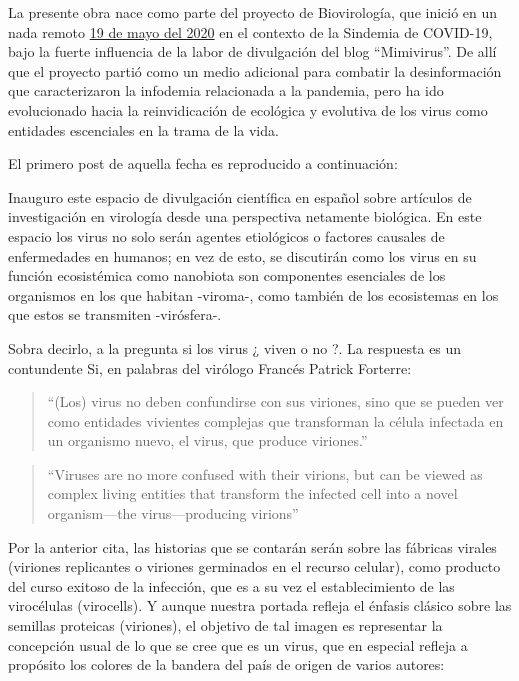 \documentclass[
  12pt, krantz2,
  spanish,
]{krantz}
\begin{document}
La presente obra nace como parte del proyecto de Biovirología, que inició en un nada remoto \href{https://www.facebook.com/permalink.php?story_fbid=107125457678944\&id=107088044349352}{19 de mayo del 2020} en el contexto de la Sindemia de COVID-19, bajo la fuerte influencia de la labor de divulgación del blog ``Mimivirus''. De allí que el proyecto partió como un medio adicional para combatir la desinformación que caracterizaron la infodemia relacionada a la pandemia, pero ha ido evolucionado hacia la reinvidicación de ecológica y evolutiva de los virus como entidades escenciales en la trama de la vida.

El primero post de aquella fecha es reproducido a continuación:

Inauguro este espacio de divulgación científica en español sobre artículos de investigación en virología desde una perspectiva netamente biológica. En este espacio los virus no solo serán agentes etiológicos o factores causales de enfermedades en humanos; en vez de esto, se discutirán como los virus en su función ecosistémica como nanobiota son componentes esenciales de los organismos en los que habitan -viroma-, como también de los ecosistemas en los que estos se transmiten -virósfera-.

Sobra decirlo, a la pregunta si los virus ¿ viven o no ?. La respuesta es un contundente Si, en palabras del virólogo Francés Patrick Forterre:

\begin{quote}
``(Los) virus no deben confundirse con sus viriones, sino que se pueden ver como entidades vivientes complejas que transforman la célula infectada en un organismo nuevo, el virus, que produce viriones.''
\end{quote}

\begin{quote}
``Viruses are no more confused with their virions, but can be viewed as complex living entities that transform the infected cell into a novel organism---the virus---producing virions'' \citet{forterre2010defining}
\end{quote}

Por la anterior cita, las historias que se contarán serán sobre las fábricas virales (viriones replicantes o viriones germinados en el recurso celular), como producto del curso exitoso de la infección, que es a su vez el establecimiento de las virocélulas (virocells). Y aunque nuestra portada refleja el énfasis clásico sobre las semillas proteicas (viriones), el objetivo de tal imagen es representar la concepción usual de lo que se cree que es un virus, que en especial refleja a propósito los colores de la bandera del país de origen de varios autores:
\end{document}
